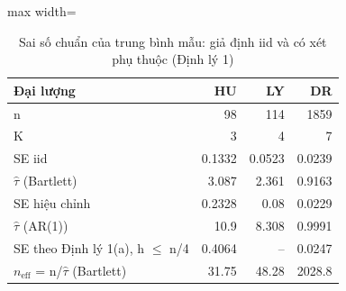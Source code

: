 \begin{table}[H]
\centering\small
\caption{Sai số chuẩn của trung bình mẫu: giả định iid và có xét phụ thuộc (Định lý 1)}\label{tab:tab_b11_03_mean_se}
\begin{adjustbox}{max width=\linewidth}
\begin{tabular}{lrrr}
\toprule
Đại lượng & HU & LY & DR \\
\midrule
n & 98 & 114 & 1859 \\
K & 3 & 4 & 7 \\
SE iid & 0.1332 & 0.0523 & 0.0239 \\
$\hat{\tau}$ (Bartlett) & 3.087 & 2.361 & 0.9163 \\
SE hiệu chỉnh & 0.2328 & 0.08 & 0.0229 \\
$\hat{\tau}$ (AR(1)) & 10.9 & 8.308 & 0.9991 \\
SE theo Định lý 1(a), h $\le$ n/4 & 0.4064 & – & 0.0247 \\
$n_{\mathrm{eff}}$ = n/$\hat{\tau}$ (Bartlett) & 31.75 & 48.28 & 2028.8 \\
\bottomrule
\end{tabular}
\end{adjustbox}\par{}
\end{table}
